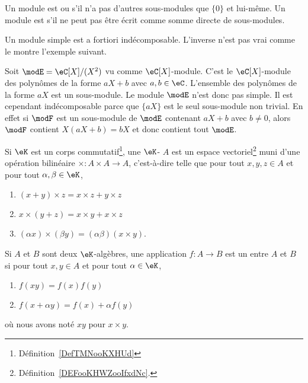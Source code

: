 \begin{definition}
    Un module est  ou  s'il n'a pas d'autres sous-modules que \( \{ 0 \}\) et lui-même. Un module est  s'il ne peut pas être écrit comme somme directe de sous-modules.
\end{definition}

Un module simple est a fortiori indécomposable. L'inverse n'est pas vrai comme le montre l'exemple suivant.

\begin{example}
    Soit \( \modE=\eC[X]/(X^2)\) vu comme \( \eC[X]\)-module. C'est le \( \eC[X]\)-module des polynômes de la forme \( aX+b\) avec \( a,b\in \eC\). L'ensemble des polynômes de la forme \( aX\) est un sous-module. Le module \( \modE\) n'est donc pas simple. Il est cependant indécomposable parce que \( \{ aX \}\) est le seul sous-module non trivial. En effet si \( \modF\) est un sous-module de \( \modE\) contenant \( aX+b\) avec \( b\neq 0\), alors \( \modF\) contient \( X(aX+b)=bX\) et donc contient tout \( \modE\).
\end{example}

\begin{definition}   \label{DefAEbnJqI}
    Si \( \eK\) est un corps commutatif\footnote{Définition~\ref{DefTMNooKXHUd}}, une \( \eK\)- \( A\) est un espace vectoriel\footnote{Définition~\ref{DEFooKHWZooIfxdNc}.} muni d'une opération bilinéaire \( \times\colon A\times A\to A\), c'est-à-dire telle que pour tout \( x,y,z\in A\) et pour tout \( \alpha,\beta\in\eK\),
    \begin{enumerate}
        \item
            \( (x+y)\times z=x\times z+y\times z\)
        \item
            \( x\times (y+z)=x\times y+x\times z\)
        \item
            \( (\alpha x)\times (\beta y)=(\alpha\beta)(x\times y)\).
    \end{enumerate}
    Si \( A\) et \( B\) sont deux \( \eK\)-algèbres, une application \( f\colon A\to B\) est un  entre \( A\) et \( B\) si pour tout \( x,y\in A\) et pour tout \( \alpha\in \eK\),
    \begin{enumerate}
        \item
            \( f(xy)=f(x)f(y)\)
        \item
            \( f(x+\alpha y)=f(x)+\alpha f(y)\)
    \end{enumerate}
    où nous avons noté \( xy\) pour \( x\times y\).
\end{definition}

